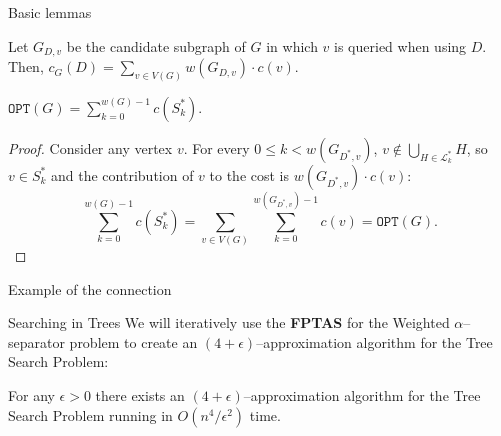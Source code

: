 \documentclass{beamer}
\newcommand{\br}[1]{\mathopen{}\left( #1 \right)}
\newcommand{\fl}[1]{\mathopen{}\left\lfloor #1 \right\rfloor}
\newcommand{\OPT}{\texttt{OPT}}
\begin{document}
\begin{frame}{Basic lemmas}
\begin{lemma}\label{contributionLemma}
Let $G_{D,v}$ be the candidate subgraph of $G$ in which 
$v$ is queried when using $D$. Then,
$
c_G\br{D} = \sum_{v \in V\br{G}} w\br{G_{D,v}} \cdot c\br{v}.
$
\end{lemma}
    \pause
\begin{lemma}
    $\OPT\br{G}=\sum_{k=0}^{w\br{G}-1}c\br{S_{k}^*}.$
    \pause
    \begin{proof}
        Consider any vertex $v$. For every $0\leq k<w\br{G_{D^*,v}}$, $v\notin \bigcup_{H\in \mathcal{L}_{k}^*}H$, so $v\in S_{k}^*$ and the contribution of $v$ to the cost is $w\br{G_{D^*,v}}\cdot c\br{v}$:
        $$\sum_{k=0}^{w\br{G}-1}c\br{S_{k}^*}=\sum_{v\in V\br{G}}\sum_{k=0}^{w\br{G_{D^*,v}}-1}c\br{v}=\OPT\br{G}.$$
    \end{proof}
\end{lemma}
\end{frame}

\begin{frame}{Example of the connection}

\end{frame}





\begin{frame}{Searching in Trees}
We will iteratively use the \textbf{FPTAS} for the Weighted $\alpha$–separator problem to create an $\br{4+\epsilon}$–approximation algorithm for the Tree Search Problem:
\pause
\begin{theorem}
    For any $\epsilon>0$ there exists an $\br{4+\epsilon}$–approximation algorithm for the Tree Search Problem running in $O\br{n^4/\epsilon^2}$ time.
\end{theorem}
    
\end{frame}
\end{document}
